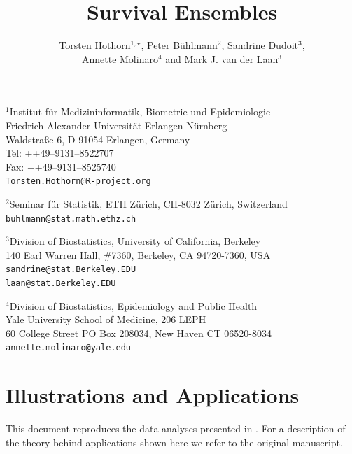 \documentclass{article}
\begin{document}

\title{Survival Ensembles}

\author{Torsten Hothorn$^{1,\star}$, Peter B\"uhlmann$^2$, Sandrine Dudoit$^3$, \\
        Annette Molinaro$^4$ and Mark J. van der Laan$^3$}
\date{}
\maketitle

\noindent$^1$Institut f\"ur Medizininformatik, Biometrie und Epidemiologie\\
     Friedrich-Alexander-Universit\"at Erlangen-N\"urnberg\\
     Waldstra{\ss}e 6, D-91054 Erlangen, Germany \\
     Tel: ++49--9131--8522707 \\
     Fax: ++49--9131--8525740 \\
     \texttt{Torsten.Hothorn@R-project.org}
\newline

\noindent$^2$Seminar f\"ur Statistik, ETH Z\"urich,
             CH-8032 Z\"urich, Switzerland \\
            \texttt{buhlmann@stat.math.ethz.ch}
\newline

\noindent$^3$Division of Biostatistics, University of California, Berkeley \\
     140 Earl Warren Hall, \#7360, Berkeley, CA 94720-7360, USA \\
    \texttt{sandrine@stat.Berkeley.EDU} \\
    \texttt{laan@stat.Berkeley.EDU}
\newline

\noindent$^4$Division of Biostatistics, Epidemiology and Public Health\\
    Yale University School of Medicine, 206 LEPH \\
    60 College Street PO Box 208034, New Haven CT 06520-8034 \\
    \texttt{annette.molinaro@yale.edu}
\newline

\section{Illustrations and Applications}

This document reproduces the data analyses presented in
\cite{hothetal06}. For a description of the theory behind
applications shown here we refer to the original manuscript.
\end{document}
